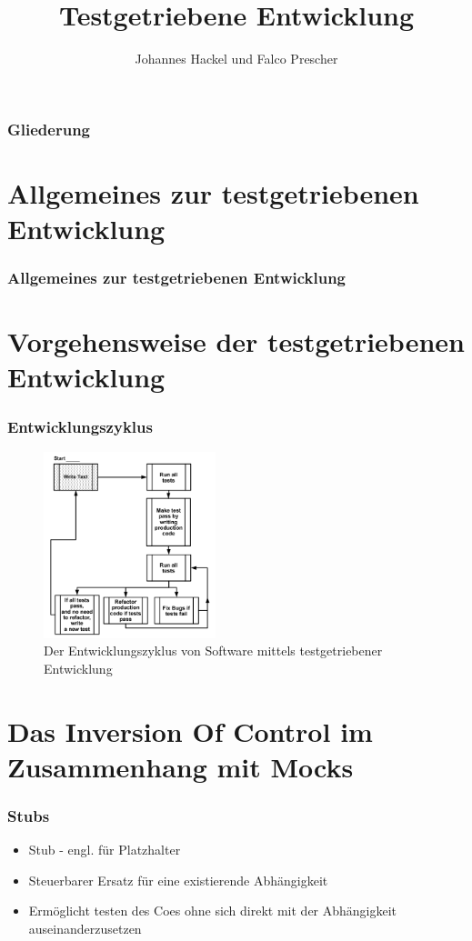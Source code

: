 \documentclass{beamer}
\author{Johannes Hackel und Falco Prescher}
\title{Testgetriebene Entwicklung}
\begin{document}
\begin{frame}
\titlepage
\end{frame}

\begin{frame}
\frametitle{Gliederung}
\tableofcontents
\end{frame}

\section{Allgemeines zur testgetriebenen Entwicklung}
\begin{frame}
\frametitle{Allgemeines zur testgetriebenen Entwicklung}
\end{frame}

\section{Vorgehensweise der testgetriebenen Entwicklung}
\begin{frame}
\frametitle{Entwicklungszyklus}
\begin{figure}[htbp]
\includegraphics[width=5cm]{zyklus.png}
\caption{Der Entwicklungszyklus von Software mittels testgetriebener Entwicklung}
\end{figure}
\end{frame}

\section{Das Inversion Of Control im Zusammenhang mit Mocks}
\begin{frame}
\frametitle{Stubs}
\begin{itemize}
\item Stub - engl. für Platzhalter
\item Steuerbarer Ersatz für eine existierende Abhängigkeit
\item Ermöglicht testen des Coes ohne sich direkt mit der Abhängigkeit auseinanderzusetzen
\end{itemize}
\end{frame}
\end{document}
